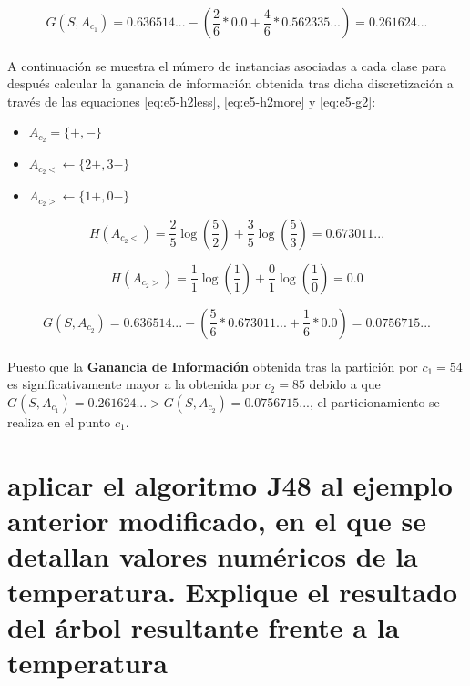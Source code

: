 \documentclass[10pt, a4paper,spanish]{article}
\begin{document}
		\begin{equation}
			\label{eq:e5-g1}
			G(S, A_{c_1}) = 0.636514... - (\frac{2}{6} * 0.0 + \frac{4}{6} * 0.562335...) = 0.261624...
		\end{equation}

		\paragraph{}
		A continuación se muestra el número de instancias asociadas a cada clase para después calcular la ganancia de información obtenida tras dicha discretización a través de las equaciones \eqref{eq:e5-h2less},  \eqref{eq:e5-h2more} y \eqref{eq:e5-g2}:

		\begin{itemize}
			\setlength\itemsep{0em}
			\item $A_{c_2} = \{ +, - \}$
			\item $A_{c_2 <} \leftarrow \{ 2+, 3- \}$
			\item $A_{c_2 >} \leftarrow \{ 1+, 0- \}$
		\end{itemize}

		\begin{equation}
			\label{eq:e5-h2less}
			H(A_{c_2 <}) = \frac{2}{5}\log(\frac{5}{2}) + \frac{3}{5}\log(\frac{5}{3}) = 0.673011...
		\end{equation}

		\begin{equation}
			\label{eq:e5-h2more}
			H(A_{c_2 >}) = \frac{1}{1}\log(\frac{1}{1}) + \frac{0}{1}\log(\frac{1}{0}) = 0.0
		\end{equation}

		\begin{equation}
			\label{eq:e5-g2}
			G(S, A_{c_2}) = 0.636514... - (\frac{5}{6} * 0.673011... + \frac{1}{6} * 0.0) = 0.0756715...
		\end{equation}

		\paragraph{}
		Puesto que la \textbf{Ganancia de Información} obtenida tras la partición por $c_1 = 54$ es significativamente mayor a la obtenida por $c_2 = 85$ debido a que $G(S, A_{c_1}) = 0.261624... > G(S, A_{c_2}) = 0.0756715...$, el particionamiento se realiza en el punto \textbf{$c_1$}.

	\section{aplicar el algoritmo J48 al ejemplo anterior modificado, en el que se detallan valores numéricos de la temperatura. Explique el resultado del árbol resultante frente a la temperatura}
\end{document}
